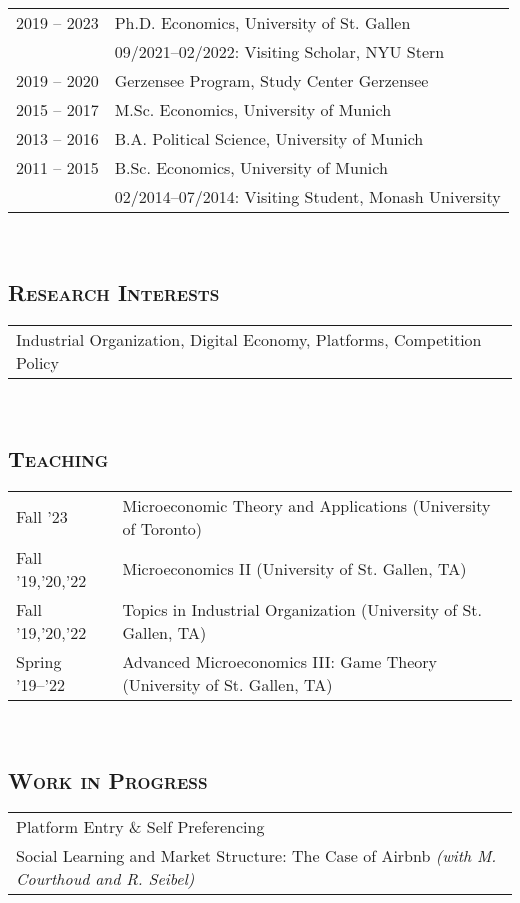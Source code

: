 \documentclass[12pt]{article}
\begin{document}
\begin{tabular}{p{}p{}}
	2019 -- 2023 & Ph.D. Economics, University of St. Gallen \\
	& \hspace{5mm} 09/2021--02/2022: Visiting Scholar, NYU Stern\\[8pt]
2019 -- 2020	& Gerzensee Program, Study Center Gerzensee\\[8pt]
2015 -- 2017& M.Sc. Economics, University of Munich\\[8pt]
2013 -- 2016& B.A. Political Science, University of Munich\\[8pt]
2011 -- 2015&B.Sc. Economics, University of Munich\\
& \hspace{5mm} 02/2014--07/2014: Visiting Student, Monash University
\end{tabular}\\
\vspace{-0.45cm}\subsection*{\textsc{Research Interests}}
\begin{tabular}{l}
	Industrial Organization, Digital Economy, Platforms, Competition Policy
\end{tabular}\\
\vspace{-0.45cm}\subsection*{\textsc{Teaching}}
\begin{tabular}{p{}p{}}
	Fall '23 		 & Microeconomic Theory and Applications (University of Toronto) \\
	Fall '19,'20,'22 & Microeconomics II (University of St. Gallen, TA)\\
	Fall '19,'20,'22 & Topics in Industrial Organization (University of St. Gallen, TA)\\
	Spring '19--'22 & Advanced Microeconomics III: Game Theory (University of St. Gallen, TA)
\end{tabular}\\
\vspace{-0.45cm}\subsection*{\textsc{Work in Progress}}
\begin{tabular}{p{}}
	Platform Entry \& Self Preferencing \\
	Social Learning and Market Structure: The Case of Airbnb \textit{(with M. Courthoud and R. Seibel)}
\end{tabular}\\
\end{document}
